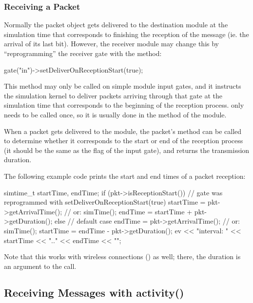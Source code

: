 \subsubsection{Receiving a Packet}

Normally the packet object gets delivered to the destination module
at the simulation time that corresponds to finishing the reception
of the message (ie. the arrival of its last bit). However, the receiver
module may change this by ``reprogramming'' the receiver gate with
the  method:

\begin{cpp}
gate("in")->setDeliverOnReceptionStart(true);
\end{cpp}

This method may only be called on simple module input gates, and it
instructs the simulation kernel to deliver packets arriving through
that gate at the simulation time that corresponds to the
beginning of the reception process.
 only needs to be called once,
so it is usually done in the  method of the module.

When a packet gets delivered to the module, the packet's
 method can be called to determine
whether it corresponds to the start or end of the reception
process (it should be the same as the 
flag of the input gate), and  returns the transmission
duration.

The following example code prints the start and end times of a packet reception:

\begin{cpp}
simtime_t startTime, endTime;
if (pkt->isReceptionStart())
{
    // gate was reprogrammed with setDeliverOnReceptionStart(true)
    startTime = pkt->getArrivalTime(); // or: simTime();
    endTime = startTime + pkt->getDuration();
}
else
{
    // default case
    endTime = pkt->getArrivalTime(); // or: simTime();
    startTime = endTime - pkt->getDuration();
}
ev << "interval: " << startTime << ".." << endTime << "\n";
\end{cpp}

Note that this works with wireless connections ()
as well; there, the duration is an argument to the 
call.



\subsection{Receiving Messages with activity()}

